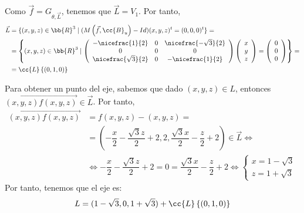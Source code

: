 \begin{ejercicio}
\begin{enumerate}
        Como $\vec{f}=G_{\theta, \vec{L}}$, tenemos que $\vec{L}=V_1$. Por tanto,
        \begin{equation*}
            \begin{split}
                \vec{L} &= \{ (x,y,z)\in \bb{R}^3 \mid (M\left(\vec{f}, \cc{B}_u\right) - Id) (x,y,z)^t = (0,0, 0)^t \} =\\
                &= \left\{ (x,y,z)\in \bb{R}^3 \mid \left(
                \begin{array}{ccc}
                    -\nicefrac{1}{2} & 0 & \nicefrac{-\sqrt{3}}{2} \\
                    0 & 0 & 0 \\
                    \nicefrac{\sqrt{3}}{2} & 0 & -\nicefrac{1}{2} 
                \end{array}
                \right)
                \left(
                \begin{array}{c}
                    x\\y\\z
                \end{array}
                \right)
                = \left(
                \begin{array}{c}
                    0\\0\\0
                \end{array}
                \right)
                \right\} =\\
                &= \cc{L}\left\{\left(0,1,0\right)\right\}
            \end{split}
        \end{equation*}

        Para obtener un punto del eje, sabemos que dado $(x,y,z)\in L$, entonces $\vec{(x,y,z)f(x,y,z)}\in \vec{L}$. Por tanto,
        \begin{align*}
            \vec{(x,y,z)f(x,y,z)} &= f(x,y,z) - (x,y,z)
            =\\&= \left(-\dfrac{x}{2} -\dfrac{\sqrt{3} z}{2} + 2, 2,\dfrac{\sqrt{3} x}{2} -\dfrac{z}{2} + 2\right) \in \vec{L} 
            \Longleftrightarrow \\ &\Longleftrightarrow
            -\dfrac{x}{2} -\dfrac{\sqrt{3} z}{2} + 2 = 0 = \dfrac{\sqrt{3} x}{2} -\dfrac{z}{2} + 2
            \Longleftrightarrow \left\{
                \begin{array}{c}
                    x = 1-\sqrt{3}\\
                    z = 1+\sqrt{3}
                \end{array}
            \right.
        \end{align*}
        Por tanto, tenemos que el eje es:
        \begin{equation*}
            L = (1-\sqrt{3}, 0,1+\sqrt{3}) + \cc{L}\left\{\left(0,1,0\right)\right\}
        \end{equation*}


\end{enumerate}
\end{ejercicio}
